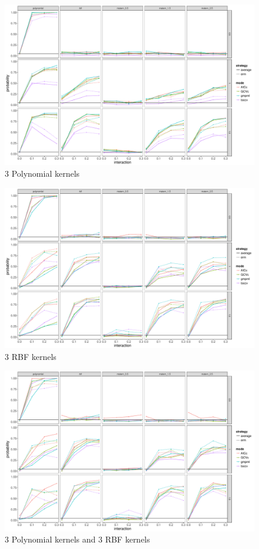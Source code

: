 \documentclass[11pt]{article}
\begin{document}
\begin{figure}
\begin{center}
\includegraphics[width=0.9\columnwidth]{L2} 
\caption{3 Polynomial kernels}
\label{fig:res}
\end{center}
\end{figure}

\begin{figure}
\begin{center}
\includegraphics[width=0.9\columnwidth]{L3} 
\caption{3 RBF kernels}
\label{fig:res}
\end{center}
\end{figure}

\begin{figure}
\begin{center}
\includegraphics[width=0.9\columnwidth]{L4} 
\caption{3 Polynomial kernels and 3 RBF kernels}
\label{fig:res}
\end{center}
\end{figure}
\end{document}
